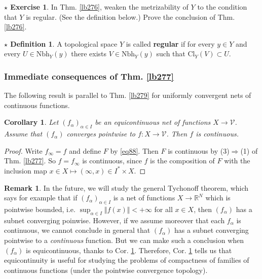 \documentclass[12pt,b5paper,notitlepage]{article}
\theoremstyle{definition}
\newtheorem{rem}[df]{Remark}
\newtheorem{sexe}[df]{$\star$ Exercise}
\newtheorem{sdf}[df]{$\star$ Definition}
\theoremstyle{plain}
\newtheorem{co}[df]{Corollary}
\newcommand{\mc}{\mathcal}
\newcommand{\Rbb}{\mathbb R}
\newcommand{\Nbh}{\mathrm{Nbh}}
\newcommand{\Cl}{\mathrm{Cl}}
\numberwithin{equation}{section}
\begin{document}
\begin{sexe}
In Thm. \ref{lb276}, weaken the metrizability of $Y$ to the condition that $Y$ is regular. (See the definition below.) Prove the conclusion of Thm. \ref{lb276}.
\end{sexe}

\begin{sdf}
A topological space $Y$ is called \textbf{regular}  if for every $y\in Y$ and every $U\in\Nbh_Y(y)$ there exists $V\in\Nbh_Y(y)$ such that $\Cl_Y(V)\subset U$.
\end{sdf}









\subsubsection{Immediate consequences of Thm. \ref{lb277}}

The following result is parallel to Thm. \ref{lb279} for uniformly convergent nets of continuous functions.

\begin{co}\label{lb303}
Let $(f_\alpha)_{\alpha\in I}$ be an equicontinuous net of functions $X\rightarrow\mc V$. Assume that $(f_\alpha)$ converges pointwise to $f:X\rightarrow\mc V$. Then $f$ is continuous.
\end{co}

\begin{proof}
Write $f_\infty=f$ and define $F$ by \eqref{eq88}. Then $F$ is continuous by (3)$\Rightarrow$(1) of Thm. \ref{lb277}. So $f=f_\infty$ is continuous, since $f$ is the composition of $F$ with the inclusion map $x\in X\mapsto (\infty,x)\in I^*\times X$.
\end{proof}






\begin{rem}\label{lb304}
In the future, we will study the general Tychonoff theorem, which says for example that if $(f_\alpha)_{\alpha\in I}$ is a net of functions $X\rightarrow\Rbb^N$ which is pointwise bounded, i.e. $\sup_{\alpha\in I}\Vert f(x)\Vert<+\infty$ for all $x\in X$, then $(f_\alpha)$ has a subnet converging poinwise. However, if we assume moreover that each $f_\alpha$ is continuous, we cannot conclude in general that $(f_\alpha)$ has a subnet converging pointwise to a \textit{continuous} function. But we can make such a conclusion when $(f_\alpha)$ is equicontinuous, thanks to Cor. \ref{lb303}. Therefore, Cor. \ref{lb303} tells us that equicontinuity is useful for studying the problems of compactness of families of continuous functions (under the pointwise convergence topology).
\end{rem}
\end{document}
